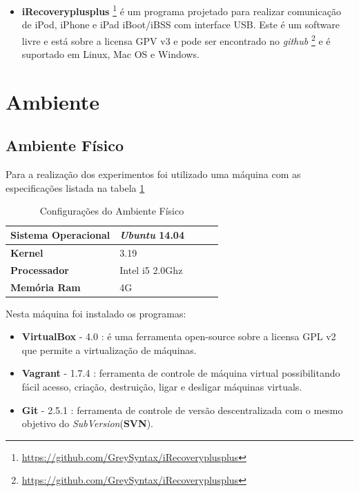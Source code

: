 \begin{itemize}
    \item \textbf{iRecoveryplusplus}
\footnote{\url{https://github.com/GreySyntax/iRecoveryplusplus}} é um programa projetado para
 realizar comunicação de iPod, iPhone e iPad iBoot/iBSS  com interface USB. 
Este é um software livre e está sobre a licensa GPV v3 e pode ser encontrado no \textit{github}
\footnote{\url{https://github.com/GreySyntax/iRecoveryplusplus}} e é suportado em Linux, Mac OS e Windows.

\end{itemize}




\section{Ambiente}

\subsection{Ambiente Físico}
Para a realização dos experimentos foi utilizado uma máquina com as
 especificações listada na tabela \ref{configuracoes_ambiente_fisico}

\begin{table}[h]
\centering
\begin{tabular}{lllll}
\textbf{Sistema Operacional} & \textit{Ubuntu} 14.04 \\ \toprule
\textbf{Kernel} & 3.19  \\ \midrule 
\textbf{Processador} & Intel i5 2.0Ghz \\ \midrule
\textbf{Memória Ram} & 4G  \\ \bottomrule 
\end{tabular} 
\caption{Configurações do Ambiente Físico}
\label{configuracoes_ambiente_fisico}
\end{table}


Nesta máquina foi instalado os programas:

\begin{itemize}
    \item \textbf{VirtualBox} - 4.0 : é uma ferramenta open-source sobre a
 licensa GPL v2 que permite a virtualização de máquinas.
    \item \textbf{Vagrant} - 1.7.4 : ferramenta de controle de
 máquina virtual possibilitando fácil acesso, criação, destruição, ligar e 
desligar máquinas virtuals.
    \item \textbf{Git} - 2.5.1 : ferramenta de controle de versão descentralizada
com o mesmo objetivo do \textit{SubVersion}(\textbf{SVN}).
\end{itemize}

